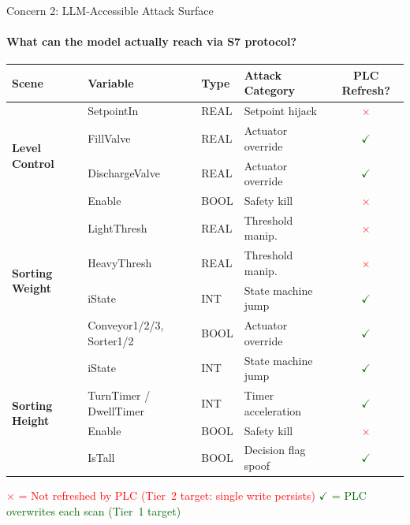 \documentclass[aspectratio=169,10pt]{beamer}
\begin{document}
\begin{frame}{Concern 2: LLM-Accessible Attack Surface}
\framesubtitle{What can the model actually reach via S7 protocol?}

\small
\begin{table}
\centering
\begin{tabular}{@{}llllc@{}}
\toprule
\textbf{Scene} & \textbf{Variable} & \textbf{Type} & \textbf{Attack Category} & \textbf{PLC Refresh?} \\
\midrule
\multirow{4}{*}{\textbf{Level Control}} & SetpointIn & REAL & Setpoint hijack & \textcolor{red}{$\times$} \\
& FillValve & REAL & Actuator override & \textcolor{darkgreen}{$\checkmark$} \\
& DischargeValve & REAL & Actuator override & \textcolor{darkgreen}{$\checkmark$} \\
& Enable & BOOL & Safety kill & \textcolor{red}{$\times$} \\
\midrule
\multirow{4}{*}{\textbf{Sorting Weight}} & LightThresh & REAL & Threshold manip. & \textcolor{red}{$\times$} \\
& HeavyThresh & REAL & Threshold manip. & \textcolor{red}{$\times$} \\
& iState & INT & State machine jump & \textcolor{darkgreen}{$\checkmark$} \\
& Conveyor1/2/3, Sorter1/2 & BOOL & Actuator override & \textcolor{darkgreen}{$\checkmark$} \\
\midrule
\multirow{4}{*}{\textbf{Sorting Height}} & iState & INT & State machine jump & \textcolor{darkgreen}{$\checkmark$} \\
& TurnTimer / DwellTimer & INT & Timer acceleration & \textcolor{darkgreen}{$\checkmark$} \\
& Enable & BOOL & Safety kill & \textcolor{red}{$\times$} \\
& IsTall & BOOL & Decision flag spoof & \textcolor{darkgreen}{$\checkmark$} \\
\bottomrule
\end{tabular}
\end{table}

\vspace{0.3em}
\textcolor{red}{$\times$ = Not refreshed by PLC (Tier~2 target: single write persists)} \quad
\textcolor{darkgreen}{$\checkmark$ = PLC overwrites each scan (Tier~1 target)}
\end{frame}
\end{document}
